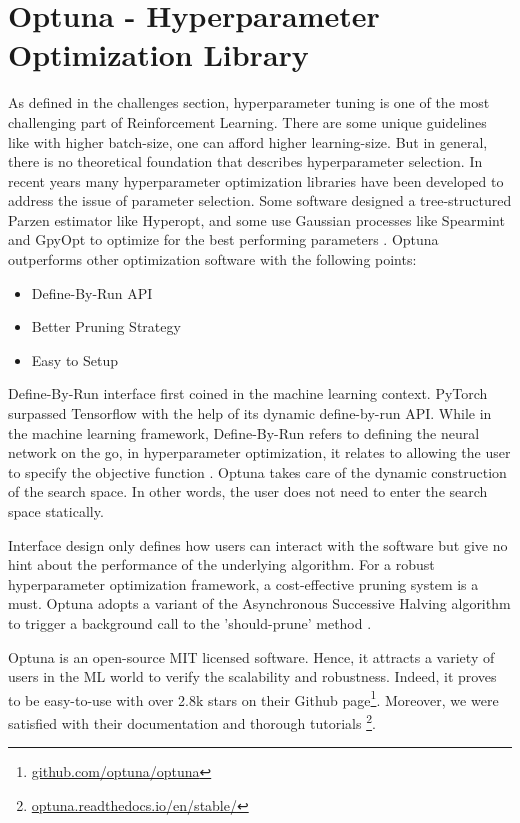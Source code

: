 \section{Optuna - Hyperparameter Optimization Library}

As defined in the challenges section, hyperparameter tuning is one of the most challenging part of Reinforcement Learning. There are some unique guidelines like with higher batch-size, one can afford higher learning-size. But in general, there is no theoretical foundation that describes hyperparameter selection. In recent years many hyperparameter optimization libraries have been developed to address the issue of parameter selection. Some software designed a tree-structured Parzen estimator like Hyperopt, and some use Gaussian processes like Spearmint and GpyOpt to optimize for the best performing parameters \cite{optuna_2019}. 
Optuna outperforms other optimization software with the following points:

\begin{itemize}
    \item Define-By-Run API 
    \item Better Pruning Strategy
    \item Easy to Setup
\end{itemize}

Define-By-Run interface first coined in the machine learning context. PyTorch surpassed Tensorflow with the help of its dynamic define-by-run API. While in the machine learning framework, Define-By-Run refers to defining the neural network on the go, in hyperparameter optimization, it relates to allowing the user to specify the objective function \cite{optuna_2019}. Optuna takes care of the dynamic construction of the search space. In other words, the user does not need to enter the search space statically.

Interface design only defines how users can interact with the software but give no hint about the performance of the underlying algorithm. For a robust hyperparameter optimization framework, a cost-effective pruning system is a must. Optuna adopts a variant of the Asynchronous Successive Halving algorithm to trigger a background call to the 'should-prune' method \cite{Li2018}.

Optuna is an open-source MIT licensed software. Hence, it attracts a variety of users in the ML world to verify the scalability and robustness. Indeed, it proves to be easy-to-use with over 2.8k stars on their Github page\footnote{\url{github.com/optuna/optuna}}. Moreover, we were satisfied with their documentation and thorough tutorials \footnote{\url{optuna.readthedocs.io/en/stable/}}.

